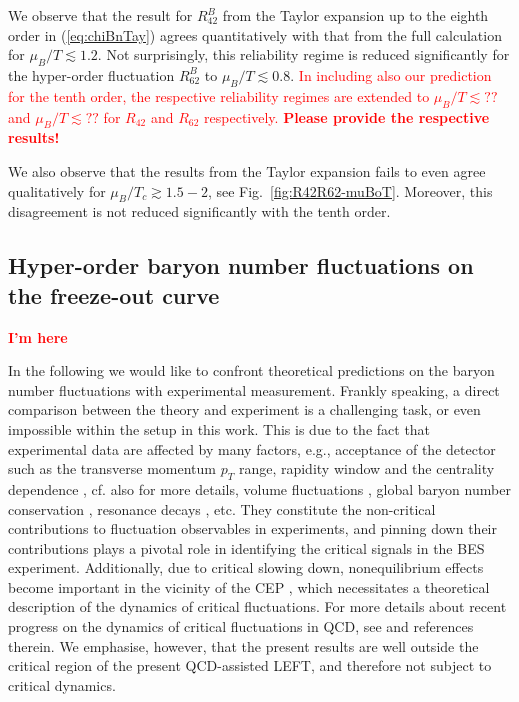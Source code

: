 \documentclass[%
reprint,
superscriptaddress,
showpacs,preprintnumbers,
amsmath,amssymb,
aps,
prd,
]{revtex4-1}
\def\Fig#1{Fig.~\ref{#1}} \def\Tab#1{Tab.~\ref{#1}}
\def\eq#1{(\ref{#1})}
\newcommand{\coljan}[1]{\textcolor{red}{#1}}
\begin{document}
We observe that the result for $R^{B}_{42}$ from the Taylor expansion up to the eighth order in \eq{eq:chiBnTay} agrees quantitatively with that from the full calculation for $\mu_B/T\lesssim 1.2$. Not surprisingly, this reliability regime is reduced significantly for the hyper-order fluctuation $R^{B}_{62}$ to $\mu_B/T\lesssim 0.8$. \coljan{In including also our prediction for the tenth order, the respective  reliability regimes are extended to $\mu_B/T\lesssim ??$ and $\mu_B/T\lesssim ??$ for $R_{42}$ and $R_{62}$ respectively. {\bf Please provide the respective results!}} 

We also observe that the results from the Taylor expansion fails to even agree qualitatively for $\mu_B/T_c \gtrsim 1.5-2$, see \Fig{fig:R42R62-muBoT}. Moreover, this disagreement is not reduced significantly with the tenth order. 

	
	
	


	


\subsection{Hyper-order baryon number fluctuations on the  freeze-out curve}
\label{subsec:freezout}	

\coljan{\bf I'm here}

In the following we would like to confront theoretical predictions on the baryon number fluctuations with experimental measurement. Frankly speaking, a direct comparison between the theory and experiment is a challenging task, or even impossible within the setup in this work. This is due to the fact that experimental data are affected by many factors, e.g.,  acceptance of the detector such as the transverse momentum $p_T$ range, rapidity window and the centrality dependence \cite{Adamczyk:2013dal,Luo:2015ewa,Adam:2020unf,Nonaka:2020crv,Pandav:2020uzx}, cf. also \cite{Luo:2017faz,Adamczyk:2017iwn} for more details, volume fluctuations \cite{Luo:2013bmi}, global baryon number conservation \cite{Braun-Munzinger:2016yjz,Vovchenko:2020tsr}, resonance decays \cite{Nahrgang:2014fza}, etc. They constitute the non-critical contributions to fluctuation observables in experiments, and pinning down their contributions plays a pivotal role in identifying the critical signals in the BES experiment. Additionally, due to critical slowing down, nonequilibrium effects become important in the vicinity of the CEP \cite{Berdnikov:1999ph}, which necessitates a theoretical description of the dynamics of critical fluctuations. For more details about recent progress on the dynamics of critical fluctuations in QCD, see \cite{Bluhm:2020mpc} and references therein. We emphasise, however, that the present results are well outside the critical region of the present QCD-assisted LEFT, and therefore not subject to critical dynamics. 
\end{document}
